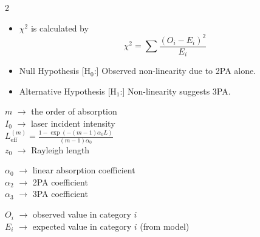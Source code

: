 \documentclass{a0poster}
\begin{document}
\begin{multicols}{2}
{\begin{minipage}[t]{\linewidth}
\begin{Box3}{}
\begin{itemize}
\item[\circleicon{highlightgreen}] $\chi^2$ is calculated by
\begin{equation}
\chi^2 = \displaystyle {\sum \frac{(O_i - E_i)^2}{E_i}}
\end{equation}

 
\item[\circleicon{black}] Null Hypothesis [$\text{H}_0$:] Observed non-linearity due to 2PA alone.
\item[\circleicon{accentorange}] Alternative Hypothesis [$\text{H}_1$:] Non-linearity suggests 3PA.

\end{itemize} 

\tcblower

\begin{tcolorbox}[colback=white!80!accentorange,colframe=white!0!red,width=\linewidth]
$m$ $\rightarrow$ the order of absorption\\
${I_0}$ $\rightarrow$ laser incident intensity\\
\(L_{\text{eff}}^{(m)} = \displaystyle\frac{1 - \exp\left(-(m-1)\alpha_0 L\right)}{(m-1)\alpha_0} \)\\
${z_0}$ $\rightarrow$ Rayleigh length

\end{tcolorbox}
\begin{tcolorbox}[colback=white!80!vibrantblue,colframe=white!10!blue,width=\linewidth]
${\alpha_0}$ $\rightarrow$ linear absorption coefficient\\
${\alpha_2}$ $\rightarrow$ 2PA coefficient \\
${\alpha_3}$ $\rightarrow$ 3PA coefficient \\
\end{tcolorbox}

\begin{tcolorbox}[colback=white!80!highlightgreen,colframe=white!10!green,width=\linewidth]
${O_i}$ $\rightarrow$ observed value in category $i$\\
${E_i}$ $\rightarrow$ expected value in category $i$ (from model) \\
\end{tcolorbox}
\end{Box3}
\end{minipage}
}

\end{multicols}
\end{document}
